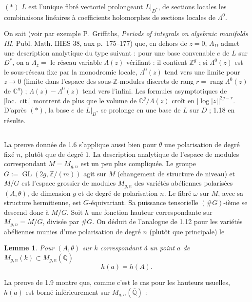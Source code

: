 \documentclass[12pt,a4paper]{article}
\theoremstyle{plain}
\newtheorem{lemma}[theorem]{Lemme}
\theoremstyle{definition}
\theoremstyle{remark}
\DeclareMathOperator{\GL}{GL}
\DeclareMathOperator{\rank}{rang}
\newcommand{\CC}{\mathbb{C}}
\newcommand{\QQ}{\mathbb{Q}}
\newcommand{\ZZ}{\mathbb{Z}}
\providecommand{\CC}{\mathbb{C}}
\providecommand{\QQ}{\mathbb{Q}}
\providecommand{\ZZ}{\mathbb{Z}}
\providecommand{\GL}{\operatorname{GL}}
\providecommand{\rank}{\operatorname{rank}}
\begin{document}
$(*)$ $L$ est l'unique fibré vectoriel prolongeant $L|_{D^*}$, de sections locales les combinaisons linéaires à coefficients holomorphes de sections locales de $\Lambda^0$.

On sait (voir par exemple P.~Griffiths, \textit{Periods of integrals on algebraic manifolds III}, Publ. Math. IHES 38, aux p.~175--177) que, en dehors de $z = 0$, $A_D$ admet une description analytique du type suivant : pour une base convenable $e$ de $L$ sur $D^*$, on a $\Lambda_z =$ le réseau variable $\Lambda(z)$ vérifiant : il contient $\ZZ^g$ ; si $\Lambda^0(z)$ est le sous-réseau fixe par la monodromie locale, $\Lambda^0(z)$ tend vers une limite pour $z \to 0$ (limite dans l'espace des sous-$\ZZ$-modules discrets de rang $r = \rank \Lambda^0(z)$ de $\CC^g$) ; $\Lambda(z) - \Lambda^0(z)$ tend vers l'infini. Les formules asymptotiques de [loc.\ cit.] montrent de plus que le volume de $\CC^g/\Lambda(z)$ croît en $|\log|z||^{2g-r}$. D'après $(*)$, la base $e$ de $L|_{D^*}$ se prolonge en une base de $L$ sur $D$ ; 1.18 en résulte.

\subsection{}

La preuve donnée de 1.6 s'applique aussi bien pour $\theta$ une polarisation de degré fixé $n$, plutôt que de degré $1$. La description analytique de l'espace de modules correspondant $M = M_{g,n}$ est un peu plus compliquée. Le groupe $G := \GL(2g, \ZZ/(m))$ agit sur $M$ (changement de structure de niveau) et $M/G$ est l'espace grossier de modules $M_{g,n}$ des variétés abéliennes polarisées $(A,\theta)$, de dimension $g$ et de degré de polarisation $n$. Le fibré $\omega$ sur $M$, avec sa structure hermitienne, est $G$-équivariant. Sa puissance tensorielle $(\#G)$-ième se descend donc à $M/G$. Soit $h$ une fonction hauteur correspondante sur $M_{g,n} = M/G$, divisée par $\#G$. On déduit de l'analogue de 1.12 pour les variétés abéliennes munies d'une polarisation de degré $n$ (plutôt que principale) le

\begin{lemma}
Pour $(A,\theta)$ sur $k$ correspondant à un point $a$ de $M_{g,n}(k) \subset M_{g,n}(\overline{\QQ})$
\[
h(a) = h(A).
\]
\end{lemma}

La preuve de 1.9 montre que, comme c'est le cas pour les hauteurs usuelles, $h(a)$ est borné inférieurement sur $M_{g,n}(\overline{\QQ})$ :
\end{document}
